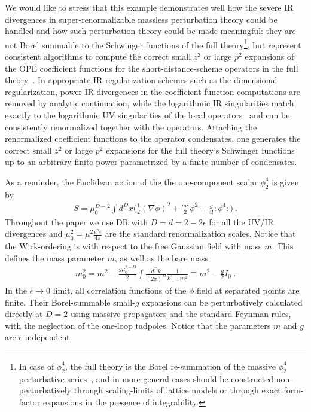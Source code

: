 \documentclass[a4paper,11pt]{article}
\begin{document}
We would like to stress that this example demonstrates well how the severe IR divergences in super-renormalizable massless perturbation theory could be handled and how such perturbation theory could be made meaningful: they are not Borel summable to the Schwinger functions of the full theory\footnote{In case of $\phi_2^4$, the full theory is the Borel re-summation of the massive $\phi_2^4$ perturbative series~\cite{eckmann1975decay}, and in more general cases should be constructed non-perturbatively through scaling-limits of lattice models or through exact form-factor expansions in the presence of integrability.}, but represent consistent algorithms to compute the correct small $z^2$ or large $p^2$ expansions of the OPE coefficient functions for the short-distance-scheme operators in the full theory~\cite{Zamolodchikov:1990bk,Lukyanov:1996jj}. In appropriate IR regularization schemes such as the dimensional regularization, power IR-divergences in the coefficient function computations are removed by analytic continuation, while the logarithmic IR singularities match exactly to the logarithmic UV singularities of the local operators~\cite{Novikov:1984rf,Zamolodchikov:1990bk} and can be consistently renormalized together with the operators. Attaching the renormalized coefficient functions to the operator condensates, one generates the correct small $z^2$ or large $p^2$ expansions for the full theory's Schwinger functions up to an arbitrary finite power parametrized by a finite number of condensates. 




As a reminder, the Euclidean action of the the one-component scalar $\phi_2^4$ is given by
\begin{align}
S=\mu_0^{D-2}\int d^Dx \bigg( \frac{1}{2}(\nabla \phi)^2+\frac{m^2}{2}\phi^2+\frac{g}{4!}:\phi^4: \bigg) \ .
\end{align}
Throughout the paper we use DR with $D=d=2-2\epsilon$ for all the UV/IR divergences and $\mu_0^2=\mu^2\frac{e^{\gamma_E}}{4\pi}$ are the standard renormalization scales. Notice that the Wick-ordering is with respect to the free Gaussian field with mass $m$. This defines the mass parameter $m$, as well as the bare mass
\begin{align}
m_0^2=m^2-\frac{g\mu_0^{2-D}}{2}\int\frac{d^Dk}{(2\pi)^D}\frac{1}{k^2+m^2}\equiv m^2-\frac{g}{2}I_0 \ .
\end{align}
In the $\epsilon \rightarrow 0$ limit, all correlation functions of the $\phi$ field at separated points are finite. Their Borel-summable small-$g$ expansions can be perturbatively calculated directly at $D=2$ using massive propagators and the standard Feynman rules, with the neglection of the one-loop tadpoles. Notice that the parameters $m$ and $g$ are $\epsilon$ independent. 
\end{document}
